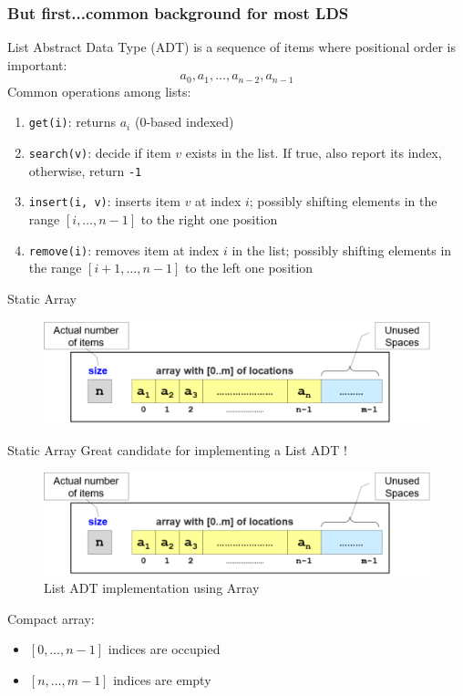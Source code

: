 \documentclass{beamer}
\begin{document}
\begin{frame}[fragile]
\frametitle{But first...common background for most LDS}
	List Abstract Data Type (ADT) is a sequence of items where positional order is important: $$a_0, a_1, \ldots, a_{n-2}, a_{n-1}$$
	Common operations among lists:
	\begin{enumerate}
		\item \verb|get(i)|: returns $a_i$ ($0$-based indexed)
		\item \verb|search(v)|: decide if item $v$ exists in the list. If true, also report its index, otherwise, return \verb|-1|
		\item \verb|insert(i, v)|: inserts item $v$ at index $i$; possibly shifting elements in the range $[i,\ldots, n-1]$ to the right one position
		\item \verb|remove(i)|: removes item at index $i$ in the list; possibly shifting elements in the range $[i+1, \ldots, n-1]$ to the left one position
	\end{enumerate}
\end{frame}

\begin{frame}{Static Array}
	\begin{figure}
		\centering
		\includegraphics[scale=0.6]{imgs/2-LDS/array/array.png}
	\end{figure}
\end{frame}

\begin{frame}{Static Array}
	Great candidate for implementing a List ADT !
	\begin{figure}
		\centering
		\includegraphics[scale=0.4]{imgs/2-LDS/array/array.png}
		\caption{List ADT implementation using Array}
	\end{figure}
	Compact array: 
	\begin{itemize}
		\item $[0,\ldots,n-1]$ indices are occupied
		\item $[n,\ldots,m-1]$ indices are empty
	\end{itemize}
\end{frame}
\end{document}
